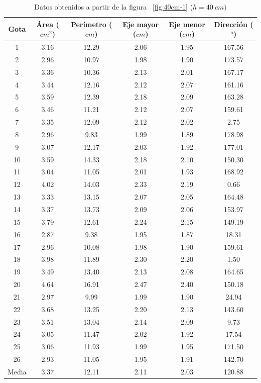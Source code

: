 \begin{table}[H] \centering \caption{Datos obtenidos a partir de la figura
    ~\ref{fig:40cm-1} ($h=40\ cm)$} \label{tab:40cm} \begin{tabular}{cccccc}
        \toprule Gota & Área ($cm^2$) & Perímetro ($cm$) & Eje mayor ($cm$) &
        Eje menor ($cm$) & Dirección ($^o$) \\ \midrule 1  & 3.16 & 12.29 &
        2.06 & 1.95 & 167.56 \\ 2  & 2.96 & 10.97 & 1.98 & 1.90 & 173.57 \\ 3
             & 3.36 & 10.36 & 2.13 & 2.01 & 167.17 \\ 4  & 3.44 & 12.16 & 2.12
             & 2.07 & 161.16 \\ 5  & 3.59 & 12.39 & 2.18 & 2.09 & 163.28 \\ 6
             & 3.46 & 11.21 & 2.12 & 2.07 & 159.61 \\ 7  & 3.35 & 12.09 & 2.12
             & 2.02 & 2.75   \\ 8  & 2.96 & 9.83  & 1.99 & 1.89 & 178.98 \\ 9
             & 3.07 & 12.17 & 2.03 & 1.92 & 177.01 \\ 10 & 3.59 & 14.33 & 2.18
             & 2.10 & 150.30 \\ 11 & 3.04 & 11.05 & 2.01 & 1.93 & 168.92 \\ 12
             & 4.02 & 14.03 & 2.33 & 2.19 & 0.66   \\ 13 & 3.33 & 13.15 & 2.07
             & 2.05 & 164.48 \\ 14 & 3.37 & 13.73 & 2.09 & 2.06 & 153.97 \\ 15
             & 3.79 & 12.61 & 2.24 & 2.15 & 149.19 \\ 16 & 2.87 & 9.38  & 1.95
             & 1.87 & 18.31  \\ 17 & 2.96 & 10.08 & 1.98 & 1.90 & 159.61 \\ 18
             & 3.98 & 11.89 & 2.30 & 2.20 & 1.50   \\ 19 & 3.49 & 13.40 & 2.13
             & 2.08 & 164.65 \\ 20 & 4.64 & 16.91 & 2.47 & 2.40 & 150.18 \\ 21
             & 2.97 & 9.99  & 1.99 & 1.90 & 24.94  \\ 22 & 3.68 & 13.25 & 2.20
             & 2.13 & 143.60 \\ 23 & 3.51 & 13.04 & 2.14 & 2.09 & 9.73   \\ 24
             & 3.05 & 11.47 & 2.02 & 1.92 & 17.54  \\ 25 & 3.06 & 11.93 & 1.99
             & 1.95 & 171.50 \\ 26 & 2.93 & 11.05 & 1.95 & 1.91 & 142.70 \\
        \midrule Media  & 3.37 & 12.11 & 2.11 & 2.03 & 120.88 \\ \bottomrule
    \end{tabular} \end{table}

